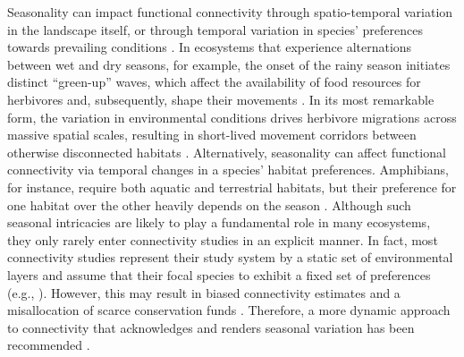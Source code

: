 \documentclass[../FinalThesis.tex]{subfiles}
\begin{document}
Seasonality can impact functional connectivity through spatio-temporal variation
in the landscape itself, or through temporal variation in species' preferences
towards prevailing conditions \citep{Mui.2017, Simpkins.2017a, Zeller.2020a}. In
ecosystems that experience alternations between wet and dry seasons, for
example, the onset of the rainy season initiates distinct ``green-up'' waves,
which affect the availability of food resources for herbivores and,
subsequently, shape their movements \citep{Merkle.2016}. In its most remarkable
form, the variation in environmental conditions drives herbivore migrations
across massive spatial scales, resulting in short-lived movement corridors
between otherwise disconnected habitats \citep{Serneels.2001, Naidoo.2016}.
Alternatively, seasonality can affect functional connectivity via temporal
changes in a species' habitat preferences. Amphibians, for instance, require
both aquatic and terrestrial habitats, but their preference for one habitat over
the other heavily depends on the season \citep{Baldwin.2006}. Although such
seasonal intricacies are likely to play a fundamental role in many ecosystems,
they only rarely enter connectivity studies in an explicit manner. In fact, most
connectivity studies represent their study system by a static set of
environmental layers and assume that their focal species to exhibit a fixed set
of preferences (e.g., \citealp{Elliot.2014, Abrahms.2017, Brennan.2020}).
However, this may result in biased connectivity estimates and a misallocation of
scarce conservation funds \citep{Osipova.2019, Zeller.2020}. Therefore, a more
dynamic approach to connectivity that acknowledges and renders seasonal
variation has been recommended \citep{Zeller.2020a}.

\end{document}
